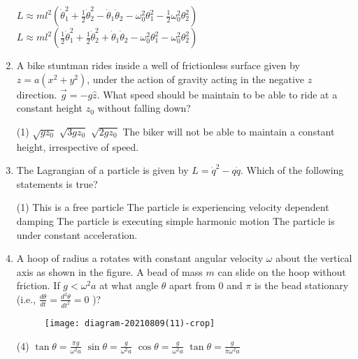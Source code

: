 \begin{enumerate}
\begin{tasks}
		\task[\textbf{C.}] $L \approx m l^{2}\left(\dot{\theta}_{1}^{2}+\frac{1}{2} \dot{\theta}_{2}^{2}-\dot{\theta}_{1} \dot{\theta}_{2}-\omega_{0}^{2} \theta_{1}^{2}-\frac{1}{2} \omega_{0}^{2} \theta_{2}^{2}\right)$
		\task[\textbf{D.}]  $L \approx m l^{2}\left(\frac{1}{2} \dot{\theta}_{1}^{2}+\frac{1}{2} \dot{\theta}_{2}^{2}+\dot{\theta}_{1} \dot{\theta}_{2}-\omega_{0}^{2} \theta_{1}^{2}-\omega_{0}^{2} \theta_{2}^{2}\right)$
	\end{tasks}
	\item A bike stuntman rides inside a well of frictionless surface given by $z=a\left(x^{2}+y^{2}\right)$, under the action of gravity acting in the negative $z$ direction. $\vec{g}=-g \hat{z} .$ What speed should be maintain to be able to ride at a constant height $z_{0}$ without falling down?
	{}
	\begin{tasks}(1)
		\task[\textbf{A.}] $\sqrt{g z_{0}}$
		\task[\textbf{B.}] $\sqrt{3 g z_{0}}$
		\task[\textbf{C.}] $\sqrt{2 g z_{0}}$
		\task[\textbf{D.}] The biker will not be able to maintain a constant height, irrespective of speed.
	\end{tasks}
	\item The Lagrangian of a particle is given by $L=\dot{q}^{2}-q \dot{q}$. Which of the following statements is true?
	{}
	\begin{tasks}(1)
		\task[\textbf{A.}]  This is a free particle
		\task[\textbf{B.}] The particle is experiencing velocity dependent damping
		\task[\textbf{C.}] The particle is executing simple harmonic motion
		\task[\textbf{D.}] The particle is under constant acceleration.
	\end{tasks}
	\item A hoop of radius a rotates with constant angular velocity $\omega$ about the
	vertical axis as shown in the figure. A bead of mass $m$ can slide on the
	hoop without friction. If $g<\omega^{2} a$ at what angle $\theta$ apart from 0 and $\pi$ is the bead stationary (i.e., $\frac{d \theta}{d t}=\frac{d^{2} \theta}{d t^{2}}=0$ )?
	{}
	\begin{figure}[H]
		\centering
		\texttt{[image: diagram-20210809(11)-crop]}
		\caption{}
		\label{}
	\end{figure}
	\begin{tasks}(4)
		\task[\textbf{A.}] $\tan \theta=\frac{\pi g}{\omega^{2} a}$
		\task[\textbf{B.}] $\sin \theta=\frac{g}{\omega^{2} a}$
		\task[\textbf{C.}] $\cos \theta=\frac{g}{\omega^{2} a}$
		\task[\textbf{D.}] $\tan \theta=\frac{g}{\pi \omega^{2} a}$

\end{tasks}
\end{enumerate}
